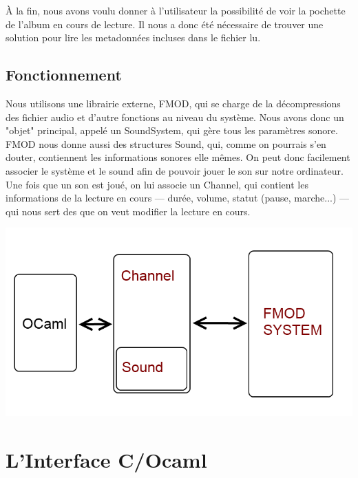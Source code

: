 \documentclass[12pt,a4paper]{report}
\begin{document}
À la fin, nous avons voulu donner à l'utilisateur la possibilité de voir la pochette de l'album en cours de lecture. Il nous a donc été nécessaire de trouver une solution pour lire les metadonnées incluses dans le fichier lu.\\

\section{Fonctionnement}

Nous utilisons une librairie externe, FMOD, qui se charge de la décompressions des fichier audio et d'autre fonctions au niveau du système. Nous avons donc un "objet" principal, appelé un SoundSystem, qui gère tous les paramètres sonore.\\
FMOD nous donne aussi des structures Sound, qui, comme on pourrais s'en douter, contiennent les informations sonores elle mêmes. On peut donc facilement associer le système et le sound afin de pouvoir jouer le son sur notre ordinateur.\\

Une fois que un son est joué, on lui associe un Channel, qui contient les informations de la lecture en cours --- durée, volume, statut (pause, marche...) --- qui nous sert des que on veut modifier la lecture en cours.

\begin{center}
\includegraphics[scale=0.5]{fmod.png}
\end{center}

\chapter{L'Interface C/Ocaml}
\end{document}
